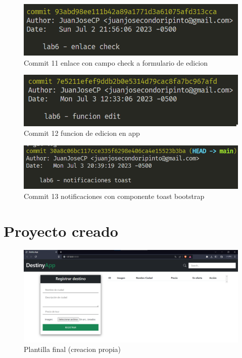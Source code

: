 \documentclass{article}
\begin{document}
    \begin{figure}
        \centering
        \includegraphics[width=150mm]{img/commit10.png}
        \caption{Commit 11 enlace con campo check a formulario de edicion}
        \label{fig:enter-label}
    \end{figure}
    \begin{figure}
        \centering
        \includegraphics[width=150mm]{img/commit11.png}
        \caption{Commit 12 funcion de edicion en app}
        \label{fig:enter-label}
    \end{figure}
    \begin{figure}
        \centering
        \includegraphics[width=150mm]{img/commit12.png}
        \caption{Commit 13 notificaciones con componente toast bootstrap}
        \label{fig:enter-label}
    \end{figure}

        
\section{Proyecto creado}
        \begin{figure}
            \centering
            \includegraphics[width=150mm]{img/img0.png}
            \caption{Plantilla final (creacion propia)}
            \label{fig:enter-label}
        \end{figure}
\end{document}

